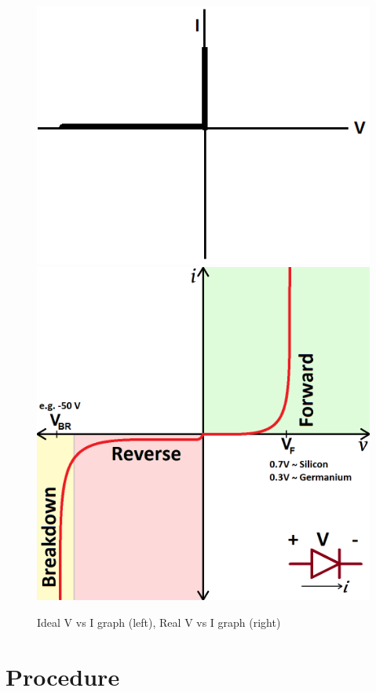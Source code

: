 \documentclass[a4paper]{article}
\begin{document}
\begin{figure}[H]
\centering
\includegraphics[scale=0.6]{08.png}\includegraphics[scale=0.23]{06.png}
\caption{\label{fig} Ideal V vs I graph (left), Real V vs I graph (right)}
\end{figure}

\section{Procedure}
\paragraph{}
\end{document}
